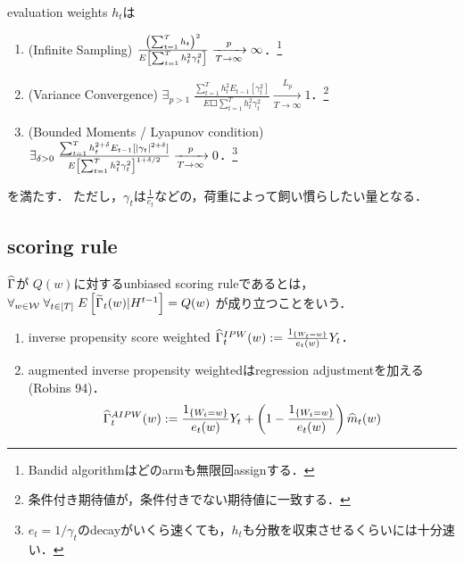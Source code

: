 \documentclass[uplatex,dvipdfmx]{jsreport}
\begin{document}
\begin{axiom}\label{axiom-adaptive-weights}
    evaluation weights $h_t$は
    \begin{enumerate}
        \item (Infinite Sampling) $\frac{\left(\sum^T_{t=1}h_t\right)^2}{E\left[\sum^T_{t=1}h_t^2\gamma_t^2\right]}\xrightarrow[T\to\infty]{p}\infty$．\footnote{Bandid algorithmはどのarmも無限回assignする．}
        \item (Variance Convergence) $\exists_{p>1}\;\frac{\sum^T_{t=1}h_t^2E_{t-1}[\gamma^2_t]}{E\Square{\sum^T_{t=1}h_t^2\gamma_t^2}}\xrightarrow[T\to\infty]{L_p}1$．\footnote{条件付き期待値が，条件付きでない期待値に一致する．}
        \item (Bounded Moments / Lyapunov condition) 
        $\exists_{\delta>0}\;\frac{\sum^T_{t=1}h_t^{2+\delta}E_{t-1}[\lvert\gamma_t\rvert^{2+\delta}]}{E\left[\sum^T_{t=1}h^2_t\gamma^2_t\right]^{1+\delta/2}}\xrightarrow[T\to\infty]{p}0$．\footnote{$e_t=1/\gamma_t$のdecayがいくら速くても，$h_t$も分散を収束させるくらいには十分速い．}
    \end{enumerate}
    を満たす．
    ただし，$\gamma_t$は$\frac{1}{e_t}$などの，荷重によって飼い慣らしたい量となる．
\end{axiom}



\subsection{scoring rule}

\begin{definition}
    $\widehat{\Gamma}$が
    $Q(w)$に対するunbiased scoring ruleであるとは，
    $\forall_{w\in\mathcal{W}}\;\forall_{t\in[T]}\;E\left[\widetilde{\Gamma}_t(w)|H^{t-1}\right]=Q(w)$
    が成り立つことをいう．
\end{definition}
\begin{example}\mbox{}\label{exp-AIPW}
    \begin{enumerate}
        \item inverse propensity score weighted $\widehat{\Gamma}_t^{IPW}(w):=\frac{1_{\left\{W_t=w\right\}}}{e_t(w)}Y_t$．
        \item augmented inverse propensity weightedはregression adjustmentを加える(Robins 94)．
        \[\widehat{\Gamma}_t^{AIPW}(w):=\frac{1_{\left\{W_t=w\right\}}}{e_t(w)}Y_t+\left(1-\frac{1_{\left\{W_t=w\right\}}}{e_t(w)}\right)\widehat{m}_t(w)\]
    \end{enumerate}
\end{example}
\end{document}
